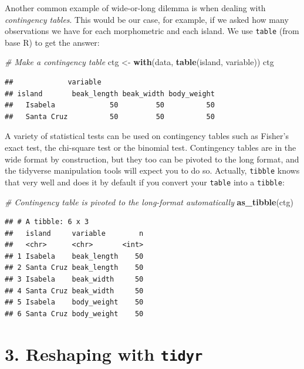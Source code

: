 \documentclass[]{book}
\newenvironment{Shaded}{}{}
\newcommand{\CommentTok}[1]{\textcolor[rgb]{0.38,0.63,0.69}{\textit{#1}}}
\newcommand{\KeywordTok}[1]{\textcolor[rgb]{0.00,0.44,0.13}{\textbf{#1}}}
\newcommand{\NormalTok}[1]{#1}
\newcommand{\StringTok}[1]{\textcolor[rgb]{0.25,0.44,0.63}{#1}}
\begin{document}
Another common example of wide-or-long dilemma is when dealing with \emph{contingency tables}. This would be our case, for example, if we asked how many observations we have for each morphometric and each island. We use \texttt{table} (from base R) to get the answer:

\begin{Shaded}
\begin{Highlighting}[]
\CommentTok{# Make a contingency table}
\NormalTok{ctg <-}\StringTok{ }\KeywordTok{with}\NormalTok{(data, }\KeywordTok{table}\NormalTok{(island, variable))}
\NormalTok{ctg}
\end{Highlighting}
\end{Shaded}

\begin{verbatim}
##             variable
## island       beak_length beak_width body_weight
##   Isabela             50         50          50
##   Santa Cruz          50         50          50
\end{verbatim}

A variety of statistical tests can be used on contingency tables such as Fisher's exact test, the chi-square test or the binomial test. Contingency tables are in the wide format by construction, but they too can be pivoted to the long format, and the tidyverse manipulation tools will expect you to do so. Actually, \texttt{tibble} knows that very well and does it by default if you convert your \texttt{table} into a \texttt{tibble}:

\begin{Shaded}
\begin{Highlighting}[]
\CommentTok{# Contingency table is pivoted to the long-format automatically}
\KeywordTok{as_tibble}\NormalTok{(ctg)}
\end{Highlighting}
\end{Shaded}

\begin{verbatim}
## # A tibble: 6 x 3
##   island     variable        n
##   <chr>      <chr>       <int>
## 1 Isabela    beak_length    50
## 2 Santa Cruz beak_length    50
## 3 Isabela    beak_width     50
## 4 Santa Cruz beak_width     50
## 5 Isabela    body_weight    50
## 6 Santa Cruz body_weight    50
\end{verbatim}

\hypertarget{reshaping-with-tidyr}{%
\section{\texorpdfstring{3. Reshaping with \texttt{tidyr}}{3. Reshaping with tidyr}}\label{reshaping-with-tidyr}}
\end{document}
